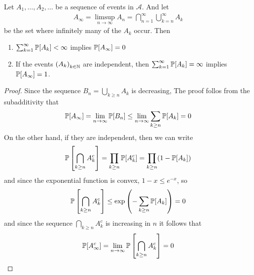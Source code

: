 \begin{lem}
Let $A_1,\ldots,A_2, \ldots$ be a sequence of events in $\mathcal{A}$. And let
\begin{align*}
  A_{\infty} = \limsup_{n \to \infty}A_n = \bigcap_{n=1}^{\infty}\bigcup_{k=n}^{\infty}A_k
\end{align*}
be the set where infinitely many of the $A_k$ occur. Then
\begin{enumerate}
  \item $\sum_{k=1}^{\infty}\mathbb{P}[A_k] < \infty$ implies $\mathbb{P}[A_{\infty}] = 0$
  \item If the events $\left(A_{k}\right)_{k \in \mathbb{N}}$ are independent, then $\sum_{k=1}^{\infty}\mathbb{P}[A_k] = \infty$ implies $\mathbb{P}[A_{\infty}] = 1$.
\end{enumerate}
\end{lem}
\begin{proof}
  Since the sequence $B_n = \bigcup_{k \geq n}A_k$ is decreasing, 
The proof follos from the subadditivity that
\begin{align*}
  \mathbb{P}[A_{\infty}] = \lim_{n \to \infty}\mathbb{P}[B_n] \leq \lim_{n \to \infty}\sum_{k \geq n}\mathbb{P}[A_k] = 0
\end{align*}
On the other hand, if they are independent, then we can write
\begin{align*}
  \mathbb{P}\left[\bigcap_{k \geq n}A_k^{c}\right]
  =
  \prod_{k\geq n}\mathbb{P}[A_k^{c}]
  =
  \prod_{k\geq n}(1 - \mathbb{P}[A_k])
\end{align*}
and since the exponential function is convex, $1 - x \leq e^{-x}$, so \begin{align*}
  \mathbb{P}\left[
\bigcap_{k \geq n}A_k^{c}
  \right]
  \leq
  \exp \left(
    - \sum_{k \geq n} \mathbb{P}[A_k]
  \right)
   = 0
\end{align*}
and since the sequence $\bigcap_{k \geq n}A_k^{c}$ is increasing in $n$ it follows that
\begin{align*}
  \mathbb{P}[A_{\infty}^{c}] = \lim_{n \to \infty} \mathbb{P}\left[\bigcap_{k \geq n}A_k^{c}\right]= 0
\end{align*}
\end{proof}
